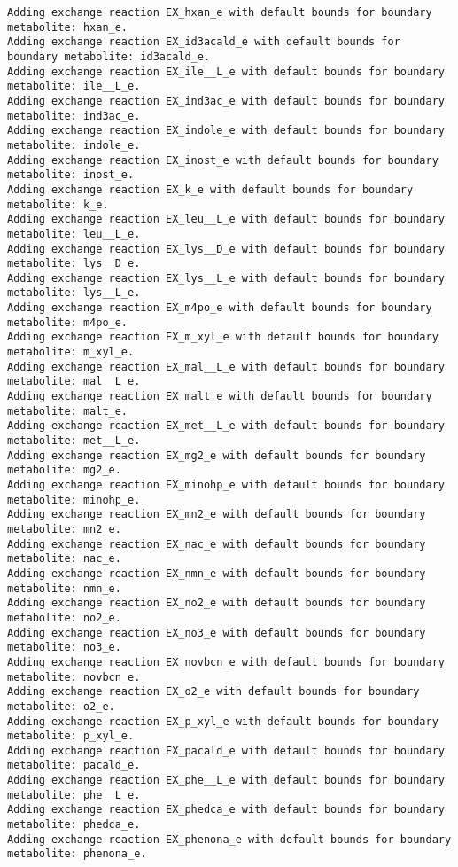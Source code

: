 \documentclass[
  letterpaper,
  DIV=11,
  numbers=noendperiod]{scrartcl}
\begin{document}
\begin{verbatim}
Adding exchange reaction EX_hxan_e with default bounds for boundary metabolite: hxan_e.
Adding exchange reaction EX_id3acald_e with default bounds for boundary metabolite: id3acald_e.
Adding exchange reaction EX_ile__L_e with default bounds for boundary metabolite: ile__L_e.
Adding exchange reaction EX_ind3ac_e with default bounds for boundary metabolite: ind3ac_e.
Adding exchange reaction EX_indole_e with default bounds for boundary metabolite: indole_e.
Adding exchange reaction EX_inost_e with default bounds for boundary metabolite: inost_e.
Adding exchange reaction EX_k_e with default bounds for boundary metabolite: k_e.
Adding exchange reaction EX_leu__L_e with default bounds for boundary metabolite: leu__L_e.
Adding exchange reaction EX_lys__D_e with default bounds for boundary metabolite: lys__D_e.
Adding exchange reaction EX_lys__L_e with default bounds for boundary metabolite: lys__L_e.
Adding exchange reaction EX_m4po_e with default bounds for boundary metabolite: m4po_e.
Adding exchange reaction EX_m_xyl_e with default bounds for boundary metabolite: m_xyl_e.
Adding exchange reaction EX_mal__L_e with default bounds for boundary metabolite: mal__L_e.
Adding exchange reaction EX_malt_e with default bounds for boundary metabolite: malt_e.
Adding exchange reaction EX_met__L_e with default bounds for boundary metabolite: met__L_e.
Adding exchange reaction EX_mg2_e with default bounds for boundary metabolite: mg2_e.
Adding exchange reaction EX_minohp_e with default bounds for boundary metabolite: minohp_e.
Adding exchange reaction EX_mn2_e with default bounds for boundary metabolite: mn2_e.
Adding exchange reaction EX_nac_e with default bounds for boundary metabolite: nac_e.
Adding exchange reaction EX_nmn_e with default bounds for boundary metabolite: nmn_e.
Adding exchange reaction EX_no2_e with default bounds for boundary metabolite: no2_e.
Adding exchange reaction EX_no3_e with default bounds for boundary metabolite: no3_e.
Adding exchange reaction EX_novbcn_e with default bounds for boundary metabolite: novbcn_e.
Adding exchange reaction EX_o2_e with default bounds for boundary metabolite: o2_e.
Adding exchange reaction EX_p_xyl_e with default bounds for boundary metabolite: p_xyl_e.
Adding exchange reaction EX_pacald_e with default bounds for boundary metabolite: pacald_e.
Adding exchange reaction EX_phe__L_e with default bounds for boundary metabolite: phe__L_e.
Adding exchange reaction EX_phedca_e with default bounds for boundary metabolite: phedca_e.
Adding exchange reaction EX_phenona_e with default bounds for boundary metabolite: phenona_e.

\end{verbatim}
\end{document}
